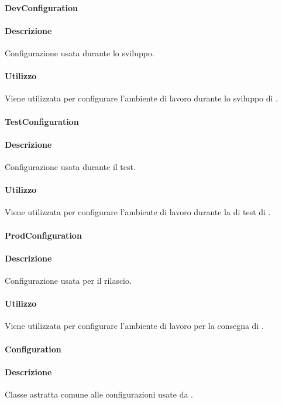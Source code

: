 \paragraph{DevConfiguration}
\paragraph*{Descrizione}
Configurazione usata durante lo sviluppo.

\paragraph*{Utilizzo}
Viene utilizzata per configurare l'ambiente di lavoro durante lo sviluppo di .

\paragraph{TestConfiguration}
\paragraph*{Descrizione}
Configurazione usata durante il test.

\paragraph*{Utilizzo}
Viene utilizzata per configurare l'ambiente di lavoro durante la  di test di .

\paragraph{ProdConfiguration}
\paragraph*{Descrizione}
Configurazione usata per il rilascio.

\paragraph*{Utilizzo}
Viene utilizzata per configurare l'ambiente di lavoro per la consegna di .

\paragraph{Configuration}
\paragraph*{Descrizione}
Classe astratta comune alle configurazioni usate da .


